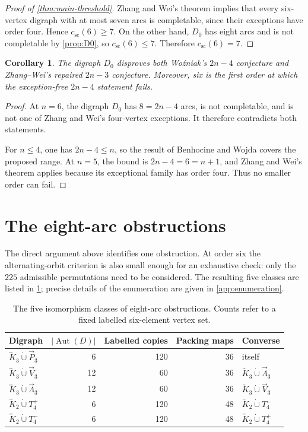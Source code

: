 \documentclass[11pt,reqno]{amsart}
\newtheorem{corollary}[theorem]{Corollary}
\theoremstyle{definition}
\newcommand{\cthreshold}{c_{\mathrm{sc}}}
\newcommand{\bK}[1]{\overleftrightarrow{K}_{#1}}
\newcommand{\dP}{\overrightarrow{P}_{3}}
\newcommand{\dV}{\overrightarrow{V}_{3}}
\newcommand{\dL}{\overrightarrow{\Lambda}_{3}}
\newcommand{\dunion}{\mathbin{\dot\cup}}
\newcommand{\Aut}{\operatorname{Aut}}
\begin{document}
\begin{proof}[Proof of \cref{thm:main-threshold}]
Zhang and Wei's theorem implies that every six-vertex digraph with at most seven arcs is completable, since their exceptions have order four. Hence \(\cthreshold(6)\ge7\). On the other hand, \(D_0\) has eight arcs and is not completable by \cref{prop:D0}, so \(\cthreshold(6)\le7\). Therefore \(\cthreshold(6)=7\).
\end{proof}

\begin{corollary}\label{cor:conjectures}
The digraph \(D_0\) disproves both Woźniak's \(2n-4\) conjecture and Zhang--Wei's repaired \(2n-3\) conjecture. Moreover, six is the first order at which the exception-free \(2n-4\) statement fails.
\end{corollary}

\begin{proof}
At \(n=6\), the digraph \(D_0\) has \(8=2n-4\) arcs, is not completable, and is not one of Zhang and Wei's four-vertex exceptions. It therefore contradicts both statements.

For \(n\le4\), one has \(2n-4\le n\), so the result of Benhocine and Wojda covers the proposed range. At \(n=5\), the bound is \(2n-4=6=n+1\), and Zhang and Wei's theorem applies because its exceptional family has order four. Thus no smaller order can fail.
\end{proof}

\section{The eight-arc obstructions}\label{sec:classification}

The direct argument above identifies one obstruction. At order six the alternating-orbit criterion is also small enough for an exhaustive check: only the \(225\) admissible permutations need to be considered. The resulting five classes are listed in \cref{tab:classes}; precise details of the enumeration are given in \cref{app:enumeration}.

\begin{table}[ht]
\caption{The five isomorphism classes of eight-arc obstructions. Counts refer to a fixed labelled six-element vertex set.}
\label{tab:classes}
\centering
\small
\setlength{\tabcolsep}{4pt}
\begin{tabular}{@{}lrrrl@{}}
\toprule
Digraph & \(|\Aut(D)|\) & Labelled copies & Packing maps & Converse \\
\midrule
\(\bK{3}\dunion\dP\) & 6  & 120 & 36 & itself \\
\(\bK{3}\dunion\dV\) & 12 & 60  & 36 & \(\bK{3}\dunion\dL\) \\
\(\bK{3}\dunion\dL\) & 12 & 60  & 36 & \(\bK{3}\dunion\dV\) \\
\(\bK{2}\dunion T_4^+\) & 6 & 120 & 48 & \(\bK{2}\dunion T_4^-\) \\
\(\bK{2}\dunion T_4^-\) & 6 & 120 & 48 & \(\bK{2}\dunion T_4^+\) \\
\bottomrule
\end{tabular}
\end{table}
\end{document}
